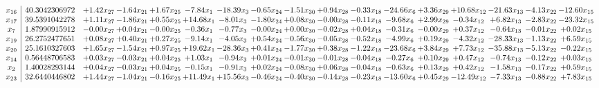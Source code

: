 \documentclass[9pt]{article}
\begin{document}
 \[\begin{array}{c| c c@{\hskip 2pt} c@{\hskip 2pt} c@{\hskip 2pt} c@{\hskip 2pt} c@{\hskip 2pt} c@{\hskip 2pt} c@{\hskip 2pt} c@{\hskip 2pt} c@{\hskip 2pt} c@{\hskip 2pt} c@{\hskip 2pt} c@{\hskip 2pt} c@{\hskip 2pt} c@{\hskip 2pt} c@{\hskip 2pt} }
 x_{16}   &  40.3042306972 & +  1.42 x_{27} & -1.64 x_{21} & +  1.67 x_{25} & -7.84 x_{1} & -18.39 x_{3} & -0.65 x_{24} & -1.51 x_{30} & +  0.94 x_{28} & -0.33 x_{18} & -24.66 x_{6} & +  3.36 x_{29} & + 10.68 x_{12} & -21.63 x_{13} & -4.13 x_{22} & -12.60 x_{15}\\
 x_{17}   &  39.5391042278 & +  1.11 x_{27} & -1.86 x_{21} & +  0.55 x_{25} & + 14.68 x_{1} & -8.01 x_{3} & -1.80 x_{24} & +  0.08 x_{30} & -0.00 x_{28} & -0.11 x_{18} & -9.68 x_{6} & +  2.99 x_{29} & -0.34 x_{12} & +  6.82 x_{13} & -2.83 x_{22} & -23.32 x_{15}\\
 x_{7}   &  1.87990915912 & -0.00 x_{27} & +  0.04 x_{21} & -0.00 x_{25} & -0.36 x_{1} & -0.77 x_{3} & -0.00 x_{24} & +  0.00 x_{30} & -0.02 x_{28} & +  0.04 x_{18} & -0.31 x_{6} & -0.00 x_{29} & +  0.37 x_{12} & -0.64 x_{13} & -0.01 x_{22} & +  0.02 x_{15}\\
 x_{19}   &  26.2752477651 & +  0.08 x_{27} & +  0.40 x_{21} & +  0.27 x_{25} & -9.14 x_{1} & -4.05 x_{3} & +  0.54 x_{24} & -0.56 x_{30} & -0.05 x_{28} & -0.52 x_{18} & -4.99 x_{6} & +  0.19 x_{29} & -4.32 x_{12} & -28.33 x_{13} & -1.13 x_{22} & +  6.59 x_{15}\\
 x_{20}   &  25.1610327603 & +  1.65 x_{27} & -1.54 x_{21} & +  0.97 x_{25} & + 19.62 x_{1} & -28.36 x_{3} & +  0.41 x_{24} & -1.77 x_{30} & +  0.38 x_{28} & -1.22 x_{18} & -23.68 x_{6} & +  3.84 x_{29} & +  7.73 x_{12} & -35.88 x_{13} & -5.13 x_{22} & -0.22 x_{15}\\
 x_{14}   &  0.56448706583 & +  0.03 x_{27} & -0.03 x_{21} & +  0.04 x_{25} & +  1.03 x_{1} & -0.94 x_{3} & +  0.01 x_{24} & -0.01 x_{30} & -0.01 x_{28} & -0.04 x_{18} & -0.27 x_{6} & +  0.10 x_{29} & +  0.47 x_{12} & -0.74 x_{13} & -0.12 x_{22} & +  0.03 x_{15}\\
 x_{2}   &  1.40028293144 & +  0.04 x_{27} & -0.03 x_{21} & +  0.04 x_{25} & -0.15 x_{1} & -0.91 x_{3} & +  0.02 x_{24} & -0.08 x_{30} & +  0.06 x_{28} & -0.04 x_{18} & -0.63 x_{6} & +  0.13 x_{29} & +  0.42 x_{12} & -1.58 x_{13} & -0.17 x_{22} & +  0.59 x_{15}\\
 x_{23}   &  32.6440446802 & +  1.44 x_{27} & -1.04 x_{21} & -0.16 x_{25} & + 11.49 x_{1} & + 15.56 x_{3} & -0.46 x_{24} & -0.40 x_{30} & -0.14 x_{28} & -0.23 x_{18} & -13.60 x_{6} & +  0.45 x_{29} & -12.49 x_{12} & -7.33 x_{13} & -0.88 x_{22} & +  7.83 x_{15}\\

\end{array}\]
\end{document}
